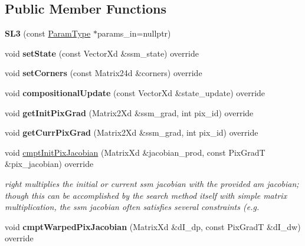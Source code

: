 \subsection*{Public Member Functions}
\begin{DoxyCompactItemize}
\item 
\hypertarget{classSL3_a3590d5d3e6acf758342ac7b70a4c16e2}{{\bfseries S\-L3} (const \hyperlink{structSL3Params}{Param\-Type} $\ast$params\-\_\-in=nullptr)}\label{classSL3_a3590d5d3e6acf758342ac7b70a4c16e2}

\item 
\hypertarget{classSL3_a76c2595f8b91e0408a7b262ae4deb4f0}{void {\bfseries set\-State} (const Vector\-Xd \&ssm\-\_\-state) override}\label{classSL3_a76c2595f8b91e0408a7b262ae4deb4f0}

\item 
\hypertarget{classSL3_a92265e84815b6fd42d3b2a083e6ed28f}{void {\bfseries set\-Corners} (const Matrix24d \&corners) override}\label{classSL3_a92265e84815b6fd42d3b2a083e6ed28f}

\item 
\hypertarget{classSL3_a9bebe1f48ec2122fb9cafa4add012761}{void {\bfseries compositional\-Update} (const Vector\-Xd \&state\-\_\-update) override}\label{classSL3_a9bebe1f48ec2122fb9cafa4add012761}

\item 
\hypertarget{classSL3_a0c0472ec42646c71110aff1f507aa7d8}{void {\bfseries get\-Init\-Pix\-Grad} (Matrix2\-Xd \&ssm\-\_\-grad, int pix\-\_\-id) override}\label{classSL3_a0c0472ec42646c71110aff1f507aa7d8}

\item 
\hypertarget{classSL3_a89eae9e1dc91207b21286723bc8c872e}{void {\bfseries get\-Curr\-Pix\-Grad} (Matrix2\-Xd \&ssm\-\_\-grad, int pix\-\_\-id) override}\label{classSL3_a89eae9e1dc91207b21286723bc8c872e}

\item 
void \hyperlink{classSL3_a5942f2e2cdd33447fa6eedd5a9104dc9}{cmpt\-Init\-Pix\-Jacobian} (Matrix\-Xd \&jacobian\-\_\-prod, const Pix\-Grad\-T \&pix\-\_\-jacobian) override
\begin{DoxyCompactList}\small\item\em right multiplies the initial or current ssm jacobian with the provided am jacobian; though this can be accomplished by the search method itself with simple matrix multiplication, the ssm jacobian often satisfies several constraints (e.\-g. \end{DoxyCompactList}\item 
\hypertarget{classSL3_abb036223aec7e6b2471e23cd14064de2}{void {\bfseries cmpt\-Warped\-Pix\-Jacobian} (Matrix\-Xd \&d\-I\-\_\-dp, const Pix\-Grad\-T \&d\-I\-\_\-dw) override}\label{classSL3_abb036223aec7e6b2471e23cd14064de2}


\end{DoxyCompactItemize}
